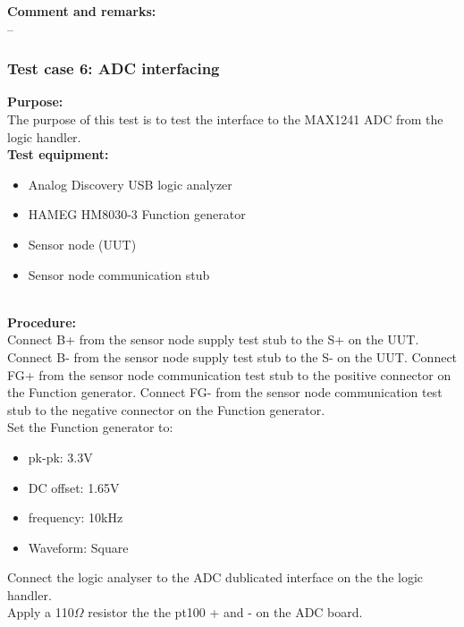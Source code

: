\textbf{Comment and remarks:}\\
--\\

\subsubsection{Test case 6: ADC interfacing}
\textbf{Purpose:}\\
The purpose of this test is to test the interface to the MAX1241 ADC from the logic handler.\\

\textbf{Test equipment:}
\begin{itemize}
	\item Analog Discovery USB logic analyzer
	\item HAMEG HM8030-3 Function generator
	\item Sensor node (UUT)
	\item Sensor node communication stub 
\end{itemize}
\ \\
\textbf{Procedure:}\\
Connect B+ from the sensor node supply test stub to the S+ on the UUT. Connect B- from the sensor node supply test stub to the S- on the UUT.
Connect FG+ from the sensor node communication test stub to the positive connector on the Function generator. Connect FG- from the sensor node communication test stub to the negative connector on the Function generator.\\ Set the Function generator to:
\begin{itemize}
	\item pk-pk: 3.3V
	\item DC offset: 1.65V
	\item frequency: 10kHz
	\item Waveform: Square
\end{itemize}

Connect the logic analyser to the ADC dublicated interface on the the logic handler.\\
Apply a 110$\Omega$ resistor the the pt100 + and - on the ADC board.


